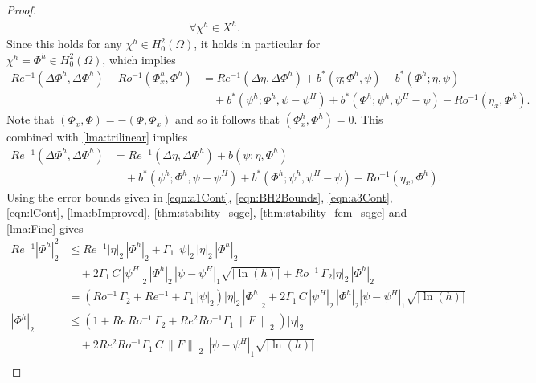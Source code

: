 \begin{proof}
\begin{equation*}
\begin{split}
      \quad \forall \chi^h \in X^h.
    \end{split}
  \end{equation*}
  Since this holds for any $\chi^h\in H^2_0(\Omega)$, it holds in particular for
  $\chi^h=\Phi^h\in H^2_0(\Omega)$, which implies
  \begin{equation*}
    \begin{split}
      Re^{-1} (\Delta \Phi^h, \Delta \Phi^h) - Ro^{-1} (\Phi^h_x,\Phi^h)
        &= Re^{-1} (\Delta \eta, \Delta \Phi^h)
        + b^*(\eta;\Phi^h, \psi) - b^*(\Phi^h;\eta,\psi) \\
      &\quad+ b^*(\psi^h;\Phi^h,\psi-\psi^H) + b^*(\Phi^h; \psi^h,\psi^H-\psi)
        - Ro^{-1} (\eta_x,\Phi^h).
    \end{split}
  \end{equation*}
  Note that $(\Phi_x,\Phi) = -(\Phi,\Phi_x)$ and so it follows that
  $(\Phi^h_x,\Phi^h) = 0$. This combined with \autoref{lma:trilinear} implies
  \begin{equation*}
    \begin{split}
      Re^{-1} (\Delta \Phi^h, \Delta \Phi^h) &= Re^{-1} (\Delta \eta, \Delta \Phi^h)
        + b(\psi;\eta,\Phi^h) \\
      &\quad+ b^*(\psi^h;\Phi^h,\psi-\psi^H) + b^*(\Phi^h; \psi^h,\psi^H-\psi)
        - Ro^{-1} (\eta_x,\Phi^h).
    \end{split}
  \end{equation*}
  Using the error bounds given in \eqref{eqn:a1Cont}, \eqref{eqn:BH2Bounds},
  \eqref{eqn:a3Cont}, \eqref{eqn:lCont}, \autoref{lma:bImproved},
  \autoref{thm:stability_sqge}, \autoref{thm:stability_fem_sqge} and
  \autoref{lma:Fine} gives
  \begin{align*}
    Re^{-1} |\Phi^h|_2^2 &\le Re^{-1} |\eta|_2\, |\Phi^h|_2 + \Gamma_1\,
      |\psi|_2\, |\eta|_2\, |\Phi^h|_2 \\
    &\quad+ 2 \Gamma_1\, C\, |\psi^H|_2\, |\Phi^h|_2\, |\psi - \psi^H|_1
      \sqrt{|\ln(h)|} + Ro^{-1}\, \Gamma_2 |\eta|_2\, |\Phi^h|_2 \\
    &= \left(Ro^{-1}\, \Gamma_2 + Re^{-1} + \Gamma_1\, |\psi|_2\right) |\eta|_2\,
      |\Phi^h|_2 + 2 \Gamma_1\, C\, |\psi^H|_2\, |\Phi^h|_2 |\psi - \psi^H|_1
      \sqrt{|\ln(h)|}  \\
    |\Phi^h|_2 &\le \left(1 + Re\, Ro^{-1}\, \Gamma_2 + Re^2 Ro^{-1} \Gamma_1\,
      \|F\|_{-2}\right) |\eta|_2 \\
      &\quad + 2 Re^2 Ro^{-1} \Gamma_1\, C\, \|F\|_{-2}\, |\psi - \psi^H|_1 \sqrt{|\ln(h)|} \\

\end{align*}
\end{proof}
